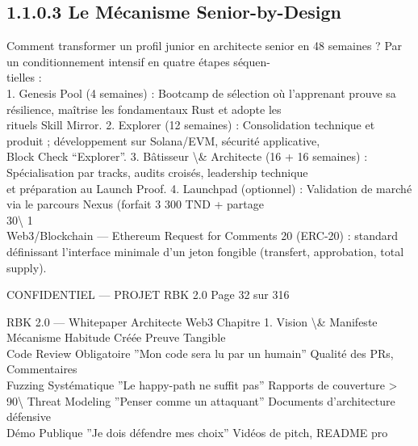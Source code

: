 \documentclass[12pt,landscape,a4paper]{article}
\newenvironment{confidential}
{\begin{tcolorbox}[
    colback=rbkred!5!white,
    colframe=rbkred!75!black,
    title=CONFIDENTIEL,
    fonttitle=\bfseries\color{white},
    coltitle=rbkred!75!black,
    breakable,
    enhanced,
    frame hidden,
    borderline west={2pt}{0pt}{rbkred!75!black}
]}
{\end{tcolorbox}}
\begin{document}
\subsection{1.1.0.3 Le Mécanisme Senior-by-Design}
\vspace{0.5em}
Comment transformer un profil junior en architecte senior en 48 semaines ? Par un conditionnement intensif en quatre étapes séquen-\\
tielles :\\
1. Genesis Pool (4 semaines) : Bootcamp de sélection où l’apprenant prouve sa résilience, maîtrise les fondamentaux Rust et adopte les\\
rituels Skill Mirror. 2. Explorer (12 semaines) : Consolidation technique et produit ; développement sur Solana/EVM, sécurité applicative,\\
Block Check “Explorer”. 3. Bâtisseur \textbackslash{}& Architecte (16 + 16 semaines) : Spécialisation par tracks, audits croisés, leadership technique\\
et préparation au Launch Proof. 4. Launchpad (optionnel) : Validation de marché via le parcours Nexus (forfait 3 300 TND + partage\\
30\textbackslash{}%
1\\
Web3/Blockchain — Ethereum Request for Comments 20 (ERC-20) : standard définissant l’interface minimale d’un jeton fongible (transfert, approbation, total\\
supply).\\
\vspace{0.5em}
\vspace{0.5em}
\vspace{0.5em}
\begin{confidential}CONFIDENTIEL — PROJET RBK 2.0                                         Page 32 sur 316\end{confidential}
RBK 2.0 — Whitepaper Architecte Web3                                                                           Chapitre 1. Vision \textbackslash{}& Manifeste\\
\vspace{0.5em}
\vspace{0.5em}
\vspace{0.5em}
Mécanisme                 Habitude Créée                     Preuve Tangible\\
Code Review Obligatoire   ”Mon code sera lu par un humain”   Qualité des PRs, Commentaires\\
Fuzzing Systématique      ”Le happy-path ne suffit pas”      Rapports de couverture \textgreater{} 90\textbackslash{}%
Threat Modeling           ”Penser comme un attaquant”        Documents d’architecture défensive\\
Démo Publique             ”Je dois défendre mes choix”       Vidéos de pitch, README pro\\
\vspace{0.5em}
\vspace{0.5em}
\vspace{0.5em}
\vspace{0.5em}
\end{document}

